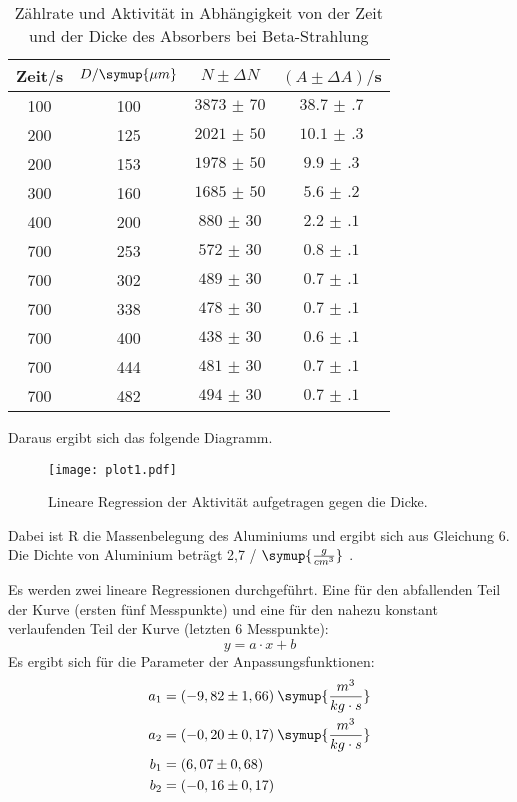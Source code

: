 \begin{table}[H]
  \centering
  \caption{Zählrate und Aktivität in Abhängigkeit von der Zeit und der Dicke des Absorbers bei Beta-Strahlung}
  \label{tab:}
  \begin{tabular}{c c c c}
    \toprule
    Zeit$/$s & $D/\symup{\mu m}$ & $N \pm \Delta N$ & $(A \pm \Delta A)/$s\\
    \midrule
    100 & 100 & $\num{3873(70)}$  &  $\num{38.7(7)}$ \\
    200 & 125 & $\num{2021(50)}$ &   $\num{10.1(3)}$ \\
    200 & 153 & $\num{1978(50)}$ &   $\num{9.9(3)}$ \\
    300 & 160 & $\num{1685(50)}$ &  $\num{5.6(2)}$ \\
    400 & 200 & $\num{880(30)}$ & $\num{2.2(1)}$ \\
    700 & 253 & $\num{572(30)}$ & $\num{0.8(1)}$ \\
    700 & 302 & $\num{489(30)}$ & $\num{0.7(1)}$ \\
    700 & 338 & $\num{478(30)}$ & $\num{0.7(1)}$ \\
    700 & 400 & $\num{438(30)}$ & $\num{0.6(1)}$ \\
    700 & 444 & $\num{481(30)}$ & $\num{0.7(1)}$ \\
    700 & 482 & $\num{494(30)}$ & $\num{0.7(1)}$ \\
    \bottomrule
  \end{tabular}
\end{table}

Daraus ergibt sich das folgende Diagramm.

\begin{figure}[H]
  \centering
  \texttt{[image: plot1.pdf]}
  \caption{Lineare Regression der Aktivität aufgetragen gegen die Dicke.}
  \label{fig:plot1}
\end{figure}

Dabei ist R die Massenbelegung des Aluminiums und ergibt sich aus Gleichung 6.
Die Dichte von Aluminium beträgt 2,7 / $\symup{\frac{g}{cm^3}}$ \cite{sample1}.

Es werden zwei lineare Regressionen durchgeführt. Eine für den abfallenden Teil der Kurve (ersten fünf Messpunkte)
und eine für den nahezu konstant verlaufenden Teil der Kurve (letzten 6 Messpunkte):
\begin{equation*}
  y = a\cdot x + b
\end{equation*}
Es ergibt sich für die Parameter der  Anpassungsfunktionen:
\begin{align*}
  a_1 &= (-9,82 \pm 1,66) \: \symup{\frac{m^3}{kg\cdot s}} \\
  a_2 &= (-0,20 \pm 0,17) \: \symup{\frac{m^3}{kg\cdot s}} \\
  b_1 &= (6,07 \pm 0,68) \\
  b_2 &= (-0,16 \pm 0,17)
\end{align*}

